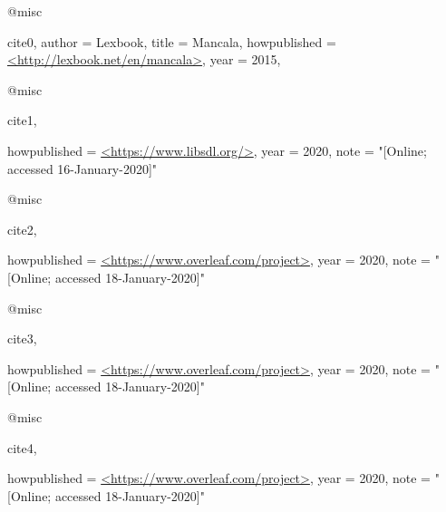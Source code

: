 @misc{cite0,
	author = {Lexbook},
    title = {Mancala},
   	howpublished = {\url{<http://lexbook.net/en/mancala>}},
    year = 2015,
   
}

@misc{cite1,
	
   	howpublished = {\url{<https://www.libsdl.org/>}},
    year = 2020,
    note = "[Online; accessed 16-January-2020]"
}

@misc{cite2,

   	howpublished = {\url{<https://www.overleaf.com/project>}},
    year = 2020,
    note = "[Online; accessed 18-January-2020]"
}

@misc{cite3,

   	howpublished = {\url{<https://www.overleaf.com/project>}},
    year = 2020,
    note = "[Online; accessed 18-January-2020]"
}


@misc{cite4,

   	howpublished = {\url{<https://www.overleaf.com/project>}},
    year = 2020,
    note = "[Online; accessed 18-January-2020]"
}

